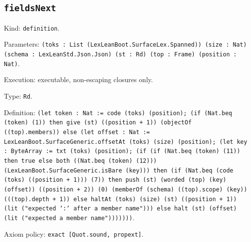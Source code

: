\documentclass[11pt]{article}
\begin{document}
\subsection*{\texttt{fieldsNext}}
\noindent Kind: \texttt{definition}.\par
\noindent Parameters: \texttt{(toks : List (LexLeanBoot.SurfaceLex.Spanned)) (size : Nat) (schema : LexLeanStd.Json.Json) (st : Rd) (top : Frame) (position : Nat)}.\par
\noindent Execution: executable, non-escaping closures only.\par
\noindent Type: \texttt{Rd}.\par
\noindent Definition: \texttt{(let token : Nat := code (toks) (position); (if (Nat.beq (token) (1)) then give (st) ((position + 1)) (objectOf ((top).members)) else (let offset : Nat := LexLeanBoot.SurfaceGeneric.offsetAt (toks) (size) (position); (let key : ByteArray := txt (toks) (position); (if (if (Nat.beq (token) (11)) then true else both ((Nat.beq (token) (12))) (LexLeanBoot.SurfaceGeneric.isBare (key))) then (if (Nat.beq (code (toks) ((position + 1))) (7)) then push (st) (worded (top) (key) (offset)) ((position + 2)) (0) (memberOf (schema) ((top).scope) (key)) (((top).depth + 1)) else haltAt (toks) (size) (st) ((position + 1)) (lit ("expected `:` after a member name"))) else halt (st) (offset) (lit ("expected a member name")))))))}.\par
\noindent Axiom policy: \texttt{exact [Quot.sound, propext]}.\par
\end{document}
